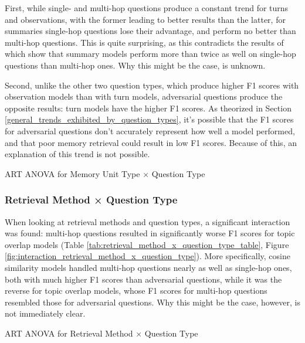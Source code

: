 First, while single- and multi-hop questions produce a constant trend for turns and observations, with the former leading to better results than the latter, for summaries single-hop questions lose their advantage, and perform no better than multi-hop questions. This is quite surprising, as this contradicts the results of \cite{Maharana2024} which show that summary models perform more than twice as well on single-hop questions than multi-hop ones. Why this might be the case, is unknown.

Second, unlike the other two question types, which produce higher F1 scores with observation models than with turn models, adversarial questions produce the opposite results: turn models have the higher F1 scores. As theorized in Section \ref{general_trends_exhibited_by_question_types}, it's possible that the F1 scores for adversarial questions don't accurately represent how well a model performed, and that poor memory retrieval could result in low F1 scores. Because of this, an explanation of this trend is not possible.


\begin{table}[h]
\centering
\tiny

\caption{ART ANOVA for Memory Unit Type × Question Type}
\label{tab:memory_unit_type_x_question_type_table}
\end{table}


\subsubsection{Retrieval Method × Question Type}

When looking at retrieval methods and question types, a significant interaction was found: multi-hop questions resulted in significantly worse F1 scores for topic overlap models (Table \ref{tab:retrieval_method_x_question_type_table}, Figure \ref{fig:interaction_retrieval_method_x_question_type}). More specifically, cosine similarity models handled multi-hop questions nearly as well as single-hop ones, both with much higher F1 scores than adversarial questions, while it was the reverse for topic overlap models, whose F1 scores for multi-hop questions resembled those for adversarial questions. Why this might be the case, however, is not immediately clear.

\begin{table}[h]
\centering
\tiny

\caption{ART ANOVA for Retrieval Method × Question Type}
\label{tab:retrieval_method_x_question_type_table}
\end{table}


